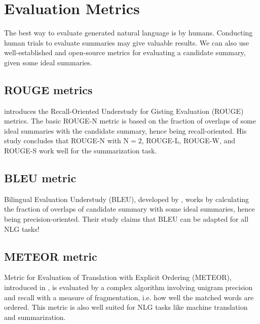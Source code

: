 \section{Evaluation Metrics}

The best way to evaluate generated natural language is by humans.
Conducting human trials to evaluate summaries may give valuable results.
We can also use well-established and open-source metrics for evaluating a candidate
summary, given some ideal summaries.


\subsection{ROUGE metrics}

\citet{lin-2004-rouge} introduces the Recall-Oriented Understudy for Gisting
Evaluation (ROUGE) metrics.
The basic ROUGE-N metric is based on the fraction of overlaps of some ideal summaries
with the candidate summary, hence being recall-oriented.
His study concludes that ROUGE-N with $\text{N}=2$, ROUGE-L, ROUGE-W, and ROUGE-S work
well for the summarization task.

\subsection{BLEU metric}

Bilingual Evaluation Understudy (BLEU), developed by \citet{papineni-etal-2002-bleu},
works by calculating the fraction of overlaps of candidate summary with some ideal
summaries, hence being precision-oriented.
Their study claims that BLEU can be adapted for all NLG tasks!


\subsection{METEOR metric}

Metric for Evaluation of Translation with Explicit Ordering (METEOR), introduced in
\citet{banerjee-lavie-2005-meteor}, is evaluated by a complex algorithm involving
unigram precision and recall with a measure of fragmentation, i.e. how well the matched
words are ordered.
This metric is also well suited for NLG tasks like machine translation and
summarization.

